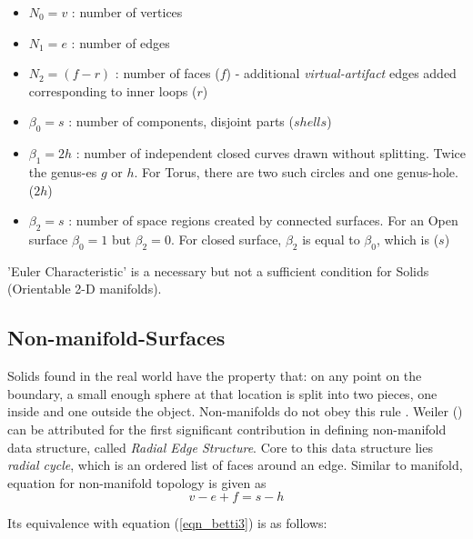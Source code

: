 \begin{itemize}
[noitemsep,topsep=2pt,parsep=2pt,partopsep=2pt,label={},leftmargin=*]
\item $N_{0} = v $ : number of vertices
\item $N_{1} = e $ : number of edges
\item $N_{2} = (f - r)$ : number of faces ($f$) - additional {\em virtual-artifact} edges added corresponding to inner loops ($r$)
\item $\beta_{0} = s$ : number of components, disjoint parts ($shells$)
\item $\beta_{1} = 2h$ : number of independent closed curves drawn without splitting. Twice the genus-es $g$ or $h$. For Torus, there are two such circles and one genus-hole. ($2h$)
\item $\beta_{2} = s$ : number of space regions created by connected surfaces. For an Open surface $\beta_{0} = 1$ but $\beta_{2}=0$. For closed surface,  $\beta_{2}$ is equal to $\beta_{0}$,  which is ($s$)
\end{itemize}

'Euler Characteristic' is a necessary but not a sufficient condition for Solids (Orientable 2-D manifolds).

\subsection{Non-manifold-Surfaces}
Solids found in the real world have the property that: on any point on the boundary, a small enough sphere at that location is split into two pieces, one inside and one outside the object. Non-manifolds do not obey this rule \cite{Krishnamurti2002}. Weiler (\cite{Weiler1986}) can be attributed for the first significant contribution in defining non-manifold data structure, called {\em Radial Edge Structure}. Core to this data structure lies {\em radial cycle}, which is an ordered list of faces around an edge. Similar to manifold, equation for non-manifold topology is given as \cite{Yamaguchi2002}
\begin{equation}
v - e + f = s - h
\label{eqn_nonmanifold}
\end{equation}

Its equivalence with equation (\ref{eqn_betti3}) is as follows:

